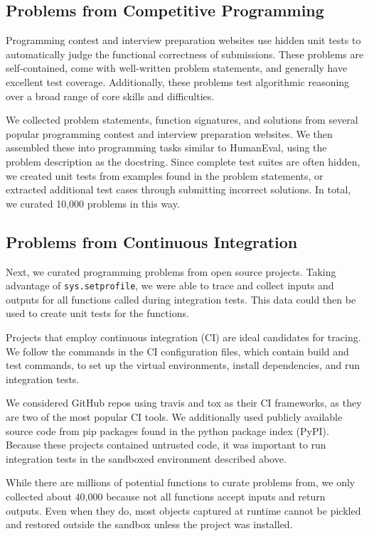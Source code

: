 \subsection{Problems from Competitive Programming}
\label{sec:sup:cpenv}

Programming contest and interview preparation websites use hidden unit tests to automatically judge the functional correctness of submissions. These problems are self-contained, come with well-written problem statements, and generally have excellent test coverage. Additionally, these problems test algorithmic reasoning over a broad range of core skills and difficulties.

We collected problem statements, function signatures, and solutions from several popular programming contest and interview preparation websites. We then assembled these into programming tasks similar to HumanEval, using the problem description as the docstring. Since complete test suites are often hidden, we created unit tests from examples found in the problem statements, or extracted additional test cases through submitting incorrect solutions. In total, we curated 10,000 problems in this way.

\subsection{Problems from Continuous Integration}
\label{sec:sup:cienv}

Next, we curated programming problems from open source projects. Taking advantage of \texttt{sys.setprofile}, we were able to trace and collect inputs and outputs for all functions called during integration tests. This data could then be used to create unit tests for the functions.

Projects that employ continuous integration (CI) are ideal candidates for tracing. We follow the commands in the CI configuration files, which contain build and test commands, to set up the virtual environments, install dependencies, and run integration tests.

We considered GitHub repos using travis and tox as their CI frameworks, as they are two of the most popular CI tools. We additionally used publicly available source code from pip packages found in the python package index (PyPI). Because these projects contained untrusted code, it was important to run integration tests in the sandboxed environment described above.

While there are millions of potential functions to curate problems from, we only collected about 40,000 because not all functions accept inputs and return outputs. Even when they do, most objects captured at runtime cannot be pickled and restored outside the sandbox unless the project was installed.

